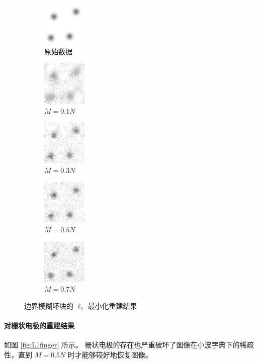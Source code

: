 \begin{figure}
\centering
\begin{subfigure}[t]{1.1in}
	\includegraphics{Figure/testdata/2dsmooth.png}
	\caption{原始数据}
\end{subfigure}
\begin{subfigure}[t]{1.1in}
	\includegraphics{Figure/L1/2dsmooth10.png}
	\caption{$M = 0.1 N$}
\end{subfigure}
\begin{subfigure}[t]{1.1in}
	\includegraphics{Figure/L1/2dsmooth30.png}
	\caption{$M = 0.3 N$}
\end{subfigure}
\begin{subfigure}[t]{1.1in}
	\includegraphics{Figure/L1/2dsmooth50.png}
	\caption{$M = 0.5 N$}
\end{subfigure}
\begin{subfigure}[t]{1.1in}
	\includegraphics{Figure/L1/2dsmooth70.png}
	\caption{$M = 0.7 N$}
\end{subfigure}
\caption{边界模糊坏块的 $\ell_1$ 最小化重建结果}
\label{fig:L12dsmooth}
\end{figure}

\paragraph{对栅状电极的重建结果} 如图 \ref{fig:L1finger}
所示。 栅状电极的存在也严重破坏了图像在小波字典下的稀疏性，直到 $M = 0.5N$
时才能够较好地恢复图像。

